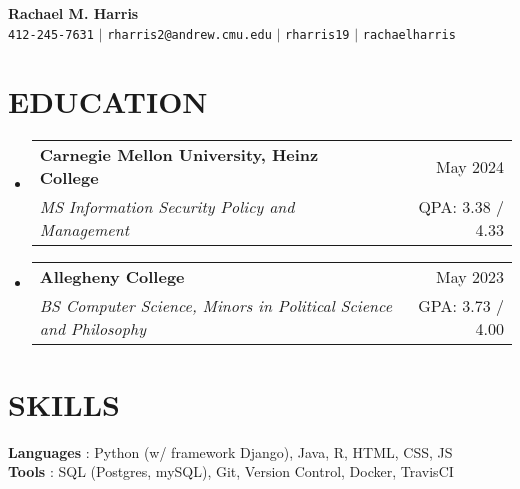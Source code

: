 \documentclass[letterpaper,11pt]{article}
\makeatletter
\newcommand{\resumeItem}[1]{
  \item\small{
    {#1 \vspace{-1pt}}
  }
}
\newcommand{\resumeSubheading}[4]{
  \vspace{-1pt}\item
    \begin{tabular*}{\textwidth}[t]{l@{\extracolsep{\fill}}r}
      \textbf{#1} & {\color{dark-grey}\small #2}\vspace{1pt}\\ %
      \textit{#3} & {\color{dark-grey} \small #4}\\ %
    \end{tabular*}\vspace{-4pt}
}
\newcommand{\resumeSubHeadingListStart}{\begin{itemize}[leftmargin=0in, label={}]}
\newcommand{\resumeSubHeadingListEnd}{\end{itemize}}
\makeatother
\begin{document}
\begin{center}
    \textbf{\Huge Rachael M. Harris} \\ \vspace{5pt}
    \small \faPhone* \texttt{412-245-7631} \hspace{1pt} $|$
    \hspace{1pt} \faEnvelope \hspace{2pt} \texttt{rharris2@andrew.cmu.edu} \hspace{1pt} $|$ 
    \hspace{1pt} \faLinkedin \hspace{2pt} \texttt{rharris19} \hspace{1pt} $|$
    \hspace{1pt} \faGithub \hspace{2pt}\texttt{rachaelharris}
    \\ \vspace{-3pt}
\end{center}

\section{EDUCATION}
  \resumeSubHeadingListStart
    \resumeSubheading
      {Carnegie Mellon University, Heinz College}{May 2024}
      {MS Information Security Policy and Management}{QPA: 3.38 / 4.33}
    \resumeSubheading
      {Allegheny College}{May 2023}
      {BS Computer Science, Minors in Political Science and Philosophy}{GPA: 3.73 / 4.00}
  \resumeSubHeadingListEnd
  
\section{SKILLS}
 \begin{itemize}[leftmargin=0in, label={}]
    \small{\item{
     \textbf{Languages} {: Python (w/ framework Django), Java, R, HTML, CSS, JS}\vspace{2pt} \\
     \textbf{Tools}     {: SQL (Postgres, mySQL), Git, Version Control, Docker, TravisCI
     }
    }}
 \end{itemize}
\end{document}

